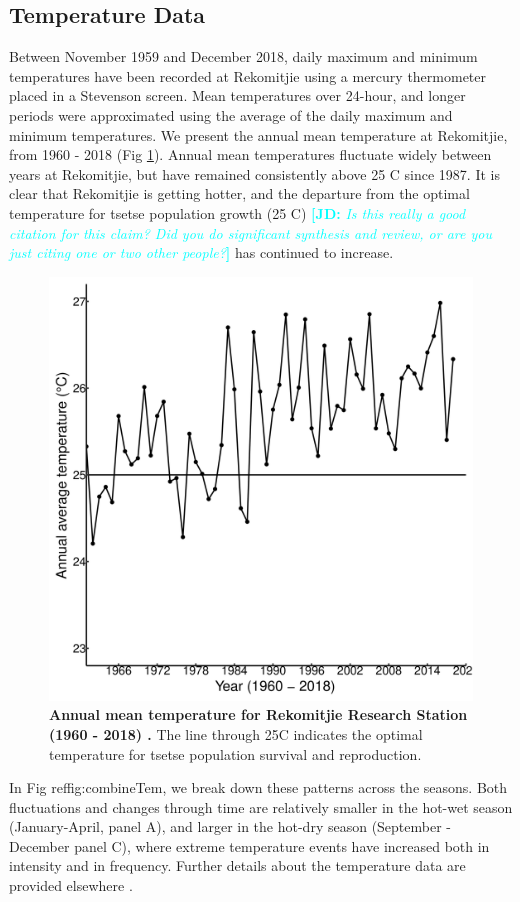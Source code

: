 \documentclass[12pt,a4paper]{article}
\newcommand{\comment}[3]{\textcolor{#1}{\textbf{[#2: }\textsl{#3}\textbf{]}}}
\newcommand{\jd}[1]{\comment{cyan}{JD}{#1}}
\begin{document}
\subsection*{Temperature Data}
Between November 1959 and December 2018, daily maximum and minimum temperatures have been recorded at Rekomitjie using a mercury thermometer placed in a Stevenson screen.  Mean temperatures over 24-hour, and longer periods were approximated using the average of the daily maximum and minimum temperatures. We present the annual mean temperature at Rekomitjie, from 1960 - 2018 (Fig \ref{fig:AnnualAveTem}). Annual mean temperatures fluctuate widely between years at Rekomitjie, but have remained consistently above 25 \degree C since 1987. It is clear that Rekomitjie is getting hotter, and the departure from the optimal temperature for tsetse population growth (25 \degree C) \cite{Are2019} \jd{Is this really a good citation for this claim? Did you do significant synthesis and review, or are you just citing one or two other people?} has continued to increase.  

\begin{figure}[hbt!]
	\centering
	\includegraphics[width=0.7\linewidth]{20April20AnnualAverageTemp1960to2018}
	\caption{{\bf Annual mean temperature for Rekomitjie Research Station (1960 - 2018) .} The line through 25\degree C indicates the optimal temperature for tsetse population survival and reproduction.}
	\label{fig:AnnualAveTem}
\end{figure}


\newpage
In Fig ref{fig:combineTem}, we break down these patterns across the seasons. Both fluctuations and changes through time are relatively smaller in the hot-wet season (January-April, panel A), and larger in the hot-dry season (September - December panel C), where extreme temperature events have increased both in intensity and in frequency. Further details about the temperature data are provided elsewhere \cite{Lord2018}.     
\end{document}
